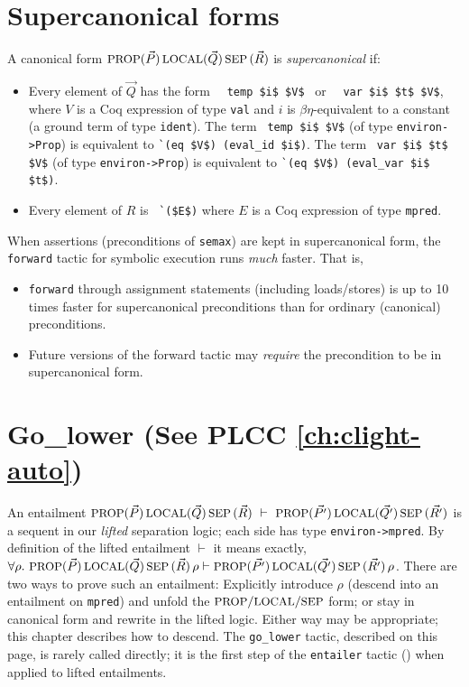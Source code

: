 \documentclass[12pt,fleqn,openany,oneside,showtrims]{memoir}
\newcommand{\ychapter}[2]{\chapter[#1]{#1 \hfill \normalsize #2}}
\begin{document}
\ychapter{Supercanonical forms}{}
\label{refcard:supercanonical}

A canonical form \(\mbox{\small PROP} (\vec{P})\,\mbox{\small LOCAL}(\vec{Q})\,\mbox{\small SEP}\,(\vec{R})\)
is \emph{supercanonical} if:
\begin{itemize}
\item Every element of $\vec{Q}$ has the form
~~\lstinline{temp $i$ $V$}~
or ~~\lstinline{var $i$ $t$ $V$},\newline
where $V$ is a Coq expression of type \lstinline{val}
and $i$ is $\beta\eta$-equivalent to
a constant (a ground term of type \lstinline{ident}).
The term ~\lstinline{temp $i$ $V$}
(of type \lstinline{environ->Prop})
is equivalent to
\lstinline{`(eq $V$) (eval_id $i$)}.
The term ~\lstinline{var $i$ $t$ $V$}
(of type \lstinline{environ->Prop})
is equivalent to
\lstinline{`(eq $V$) (eval_var $i$ $t$)}.

\item Every element of $R$ is
~\lstinline{`($E$)} where $E$ is a Coq expression of type \lstinline{mpred}.
\end{itemize}

When assertions (preconditions of \lstinline{semax}) are kept
in supercanonical form, the \lstinline{forward} tactic
for symbolic execution runs \emph{much} faster.  That is,
\begin{itemize}
\item \lstinline{forward} through assignment statements
(including loads/stores) is up to 10 times faster for supercanonical
preconditions than for ordinary (canonical) preconditions.
\item Future versions of the forward tactic may \emph{require}
the precondition to be in supercanonical form.
\end{itemize}

\ychapter{Go\_lower}{(See PLCC \autoref{ch:clight-auto})}
\label{refcard:go-lower}
An entailment
$\mbox{\small PROP} (\vec{P})\,\mbox{\small LOCAL}(\vec{Q})\,\mbox{\small SEP}\,(\vec{R})~
\vdash ~
\mbox{\small PROP} (\vec{P'})\,\mbox{\small LOCAL}(\vec{Q'})\,\mbox{\small SEP}\,(\vec{R'})
$
is a sequent in our \emph{lifted} separation logic;
each side
has type \lstinline{environ->mpred}.  By definition of the lifted
entailment $\vdash$ it means exactly,\linebreak
$\forall \rho.~
\mbox{\small PROP} (\vec{P})\,\mbox{\small LOCAL}(\vec{Q})\,\mbox{\small SEP}\,(\vec{R})\,\rho
\vdash
\mbox{\small PROP} (\vec{P'})\,\mbox{\small LOCAL}(\vec{Q'})\,\mbox{\small SEP}\,(\vec{R'})\,\rho
$. \linebreak
There are two ways to prove such an entailment:
Explicitly introduce $\rho$ (descend
into an entailment on \lstinline{mpred}) and
unfold the $\mbox{\small PROP}/\mbox{\small LOCAL}/\mbox{\small SEP}$ form;
or stay in canonical form and rewrite in
the lifted logic.
Either way may be appropriate; this chapter describes
how to descend.
The \lstinline{go_lower} tactic, described on this page,
is rarely called directly; it is the first step of the
\lstinline{entailer} tactic ()
when applied to lifted entailments.
\end{document}
